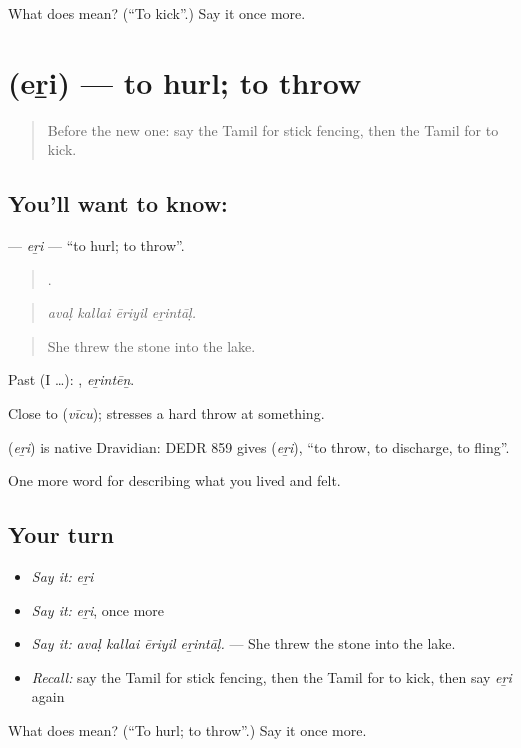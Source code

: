 \begin{tcolorbox}[breakable,colback=teal!4,colframe=teal!35!black,title={Before you move on}]
What does  mean? (\textquotedblleft{}To kick\textquotedblright{}.) Say it once more.
\end{tcolorbox}
\section[\texorpdfstring{\ta{எறி} (eṟi)}{எறி (eṟi)}]{ (eṟi) — to hurl; to throw}

\label{lesson:TA-C532-eri-throw}



\begin{quote}
Before the new one: say the Tamil for stick fencing, then the Tamil for to kick.
\end{quote}

\subsection*{You'll want to know: }
\textbf{} — \emph{eṟi} — \textquotedblleft{}to hurl; to throw\textquotedblright{}.

\begin{quote}
   .
\end{quote}

\begin{quote}
\emph{avaḷ kallai ēriyil eṟintāḷ.}
\end{quote}

\begin{quote}
She threw the stone into the lake.
\end{quote}

Past (I …): , \emph{eṟintēṉ}.

Close to  (\emph{vīcu});  stresses a hard throw at something.

\begin{cousinweb}
\textbf{} (\emph{eṟi}) is native Dravidian: DEDR 859 gives  (\emph{eṟi}), \textquotedblleft{}to throw, to discharge, to fling\textquotedblright{}.
\end{cousinweb}

\begin{grammarlens}[title={What you've built}]
One more word for describing what you lived and felt.
\end{grammarlens}

\subsection*{Your turn}
\begin{itemize}
\raggedright
  \item \emph{Say it:} \emph{eṟi}
  \item \emph{Say it:} \emph{eṟi}, once more
  \item \emph{Say it:} \emph{avaḷ kallai ēriyil eṟintāḷ.} — She threw the stone into the lake.
  \item \emph{Recall:} say the Tamil for stick fencing, then the Tamil for to kick, then say \emph{eṟi} again
\end{itemize}

\begin{tcolorbox}[breakable,colback=teal!4,colframe=teal!35!black,title={Before you move on}]
What does  mean? (\textquotedblleft{}To hurl; to throw\textquotedblright{}.) Say it once more.
\end{tcolorbox}
